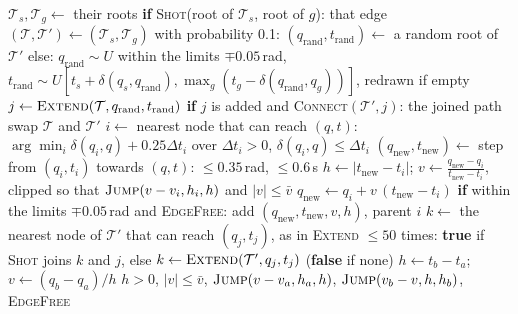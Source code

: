\documentclass[conference]{IEEEtran}
\begin{document}
\begin{algorithm}[!t]
  \caption{(B): space-time RRT-Connect}
  \label{alg:rrt}
  \footnotesize
  \begin{algorithmic}[1]
      \State $\mathcal T_s,\mathcal T_g\gets$ their roots
        \State \textbf{if} \textsc{Shot}(root of $\mathcal T_s$, root of $g$): \Return that edge
      \EndFor
      \State $(\mathcal T,\mathcal T')\gets(\mathcal T_s,\mathcal T_g)$
        \State with probability 0.1: $(q_{\text{rand}},t_{\text{rand}})\gets$ a random root of $\mathcal T'$
        \State else: $q_{\text{rand}}\sim U$ within the limits $\mp0.05$\,rad, $t_{\text{rand}}\sim U[t_s+\delta(q_s,
          q_{\text{rand}}),\max_g(t_g-\delta(q_{\text{rand}},q_g))]$, redrawn if empty
        \State $j\gets\textsc{Extend}(\mathcal T,q_{\text{rand}},t_{\text{rand}})$
        \State \textbf{if} $j$ is added and \textsc{Connect}$(\mathcal T',j)$: \Return the joined path
        \State swap $\mathcal T$ and $\mathcal T'$
      \EndWhile
    \EndProcedure
     
      \State $i\gets$ nearest node that can reach $(q,t)$: $\arg\min_i\delta(q_i,q)+0.25\Delta t_i$ over
        $\Delta t_i>0$, $\delta(q_i,q)\le\Delta t_i$
      \State $(q_{\text{new}},t_{\text{new}})\gets$ step from $(q_i,t_i)$ towards $(q,t)$: $\le0.35$\,rad, $\le0.6$\,s
      \State $h\gets|t_{\text{new}}-t_i|$; $v\gets\frac{q_{\text{new}}-q_i}{t_{\text{new}}-t_i}$, clipped so that
        $\textsc{Jump}(v-v_i,h_i,h)$ and $|v|\le\bar v$
      \State $q_{\text{new}}\gets q_i+v\,(t_{\text{new}}-t_i)$
      \State \textbf{if} within the limits $\mp0.05$\,rad and \textsc{EdgeFree}: add $(q_{\text{new}},t_{\text{new}},
        v,h)$, parent $i$
    \EndFunction
     
      \State $k\gets$ the nearest node of $\mathcal T'$ that can reach $(q_j,t_j)$, as in \textsc{Extend}
      \State $\le50$ times: \textbf{true} if \textsc{Shot} joins $k$ and $j$, else $k\gets\textsc{Extend}(\mathcal
        T',q_j,t_j)$ (\textbf{false} if none)
    \EndFunction
     
      \State $h\gets t_b-t_a$; $v\gets(q_b-q_a)/h$
      \State \Return $h>0$, $|v|\le\bar v$, $\textsc{Jump}(v-v_a,h_a,h)$, $\textsc{Jump}(v_b-v,h,h_b)$, \textsc{EdgeFree}
    \EndFunction
  \end{algorithmic}
\end{algorithm}
\end{document}
